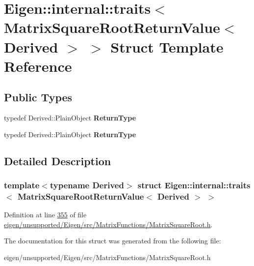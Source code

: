 \hypertarget{struct_eigen_1_1internal_1_1traits_3_01_matrix_square_root_return_value_3_01_derived_01_4_01_4}{}\section{Eigen\+:\+:internal\+:\+:traits$<$ Matrix\+Square\+Root\+Return\+Value$<$ Derived $>$ $>$ Struct Template Reference}
\label{struct_eigen_1_1internal_1_1traits_3_01_matrix_square_root_return_value_3_01_derived_01_4_01_4}
\subsection*{Public Types}
\begin{DoxyCompactItemize}
\item 
\mbox{\label{struct_eigen_1_1internal_1_1traits_3_01_matrix_square_root_return_value_3_01_derived_01_4_01_4_a140e381a31d5d89eb4aa3ac4504cc28c}} 
typedef Derived\+::\+Plain\+Object {\bfseries Return\+Type}
\item 
\mbox{\label{struct_eigen_1_1internal_1_1traits_3_01_matrix_square_root_return_value_3_01_derived_01_4_01_4_a140e381a31d5d89eb4aa3ac4504cc28c}} 
typedef Derived\+::\+Plain\+Object {\bfseries Return\+Type}
\end{DoxyCompactItemize}


\subsection{Detailed Description}
\subsubsection*{template$<$typename Derived$>$\newline
struct Eigen\+::internal\+::traits$<$ Matrix\+Square\+Root\+Return\+Value$<$ Derived $>$ $>$}



Definition at line \hyperlink{eigen_2unsupported_2_eigen_2src_2_matrix_functions_2_matrix_square_root_8h_source_l00355}{355} of file \hyperlink{eigen_2unsupported_2_eigen_2src_2_matrix_functions_2_matrix_square_root_8h_source}{eigen/unsupported/\+Eigen/src/\+Matrix\+Functions/\+Matrix\+Square\+Root.\+h}.



The documentation for this struct was generated from the following file\+:\begin{DoxyCompactItemize}
\item 
eigen/unsupported/\+Eigen/src/\+Matrix\+Functions/\+Matrix\+Square\+Root.\+h\end{DoxyCompactItemize}
